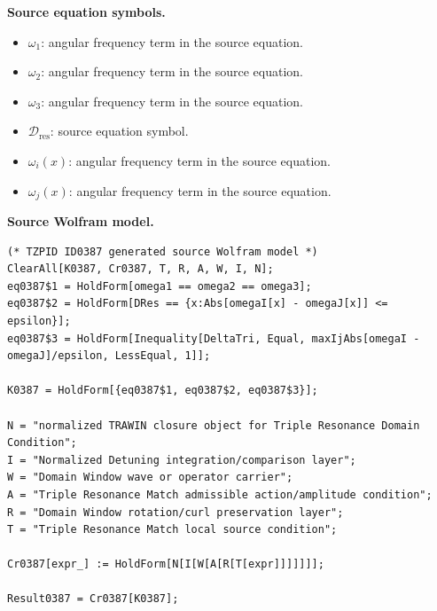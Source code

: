 \begin{minipage}[t]{0.49\linewidth}
\begingroup
\small
\raggedright
\textbf{Source equation symbols.}\par
\begin{itemize}[leftmargin=1.35em,itemsep=1pt,topsep=1pt,parsep=0pt]
    \item $\omega_{1}$: angular frequency term in the source equation.
    \item $\omega_{2}$: angular frequency term in the source equation.
    \item $\omega_{3}$: angular frequency term in the source equation.
    \item $\mathcal{D}_{\mathrm{res}}$: source equation symbol.
    \item $\omega_i(x)$: angular frequency term in the source equation.
    \item $\omega_j(x)$: angular frequency term in the source equation.
\end{itemize}
\endgroup
\end{minipage}\hfill
\begin{minipage}[t]{0.47\linewidth}
\begingroup
\scriptsize
\raggedright
\textbf{Source Wolfram model.}\par
\begin{Verbatim}[fontsize=\tiny,breaklines=true,breakanywhere=true]
(* TZPID ID0387 generated source Wolfram model *)
ClearAll[K0387, Cr0387, T, R, A, W, I, N];
eq0387$1 = HoldForm[omega1 == omega2 == omega3];
eq0387$2 = HoldForm[DRes == {x:Abs[omegaI[x] - omegaJ[x]] <= epsilon}];
eq0387$3 = HoldForm[Inequality[DeltaTri, Equal, maxIjAbs[omegaI - omegaJ]/epsilon, LessEqual, 1]];

K0387 = HoldForm[{eq0387$1, eq0387$2, eq0387$3}];

N = "normalized TRAWIN closure object for Triple Resonance Domain Condition";
I = "Normalized Detuning integration/comparison layer";
W = "Domain Window wave or operator carrier";
A = "Triple Resonance Match admissible action/amplitude condition";
R = "Domain Window rotation/curl preservation layer";
T = "Triple Resonance Match local source condition";

Cr0387[expr_] := HoldForm[N[I[W[A[R[T[expr]]]]]]];

Result0387 = Cr0387[K0387];
\end{Verbatim}
\endgroup
\end{minipage}

